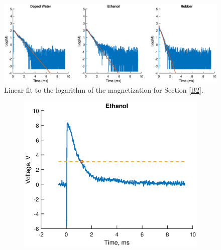 \begin{figure}[H]
    \centering
    \includegraphics[width=\textwidth]{figures/appendix/A_B2_1.eps}
    \caption{Linear fit to the logarithm of the magnetization for Section \ref{B2}.}
    \label{fig:A_B2_logfit}
\end{figure}

\begin{figure}[H]
    \centering
    \begin{subfigure}[t]{0.5\textwidth}
        \centering
        \includegraphics[width=\textwidth]{figures/appendix/A_B2_2.eps}
    \end{subfigure}%
    ~ 
    \begin{subfigure}[t]{0.5\textwidth}
        \centering

\end{subfigure}
\end{figure}
